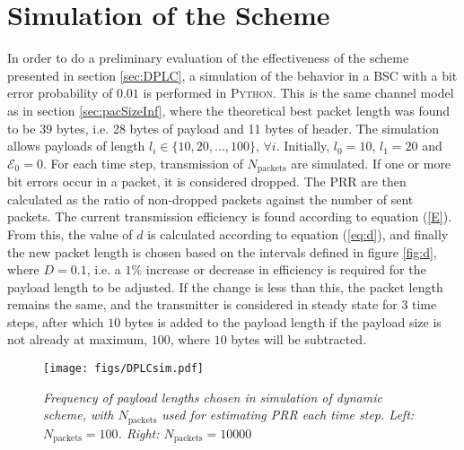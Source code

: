 \section{Simulation of the Scheme\label{sec:simScheme}}
In order to do a preliminary evaluation of the effectiveness of the scheme presented in section \ref{sec:DPLC}, a simulation of the behavior in a BSC with a bit error probability of $0.01$ is performed in \textsc{Python}. This is the same channel model as in section \ref{sec:pacSizeInf}, where the theoretical best packet length was found to be 39 bytes, i.e. 28 bytes of payload and 11 bytes of header. 
The simulation allows payloads of length $l_i \in \{10, 20, ... , 100\}$, $\forall i$. Initially, $l_0 = 10$, $l_1 = 20$ and $\mathcal{E}_0 = 0$. For each time step, transmission of $N_{\text{packets}}$ are simulated. If one or more bit errors occur in a packet, it is considered dropped. The PRR are then calculated as the ratio of non-dropped packets against the number of sent packets. The current transmission efficiency is found according to equation (\ref{E}). From this, the value of $d$ is calculated according to equation (\ref{eq:d}), and finally the new packet length is chosen based on the intervals defined in figure \ref{fig:d}, where $D=0.1$, i.e. a $1 \%$ increase or decrease in efficiency is required for the payload length to be adjusted. If the change is less than this, the packet length remains the same, and the transmitter is considered in steady state for $3$ time steps, after which $10$ bytes is added to the payload length if the payload size is not already at maximum, $100$, where $10$ bytes will be subtracted.
\\[8pt]
\begin{figure}
\centering
\texttt{[image: figs/DPLCsim.pdf]} 
\caption{\textit{Frequency of payload lengths chosen in simulation of dynamic scheme, with $N_{\text{packets}}$ used for estimating PRR each time step.
Left: $N_{\text{packets}}=100$. Right: $N_{\text{packets}} = 10000$}\label{fig:DPLCsim}}
\end{figure}
